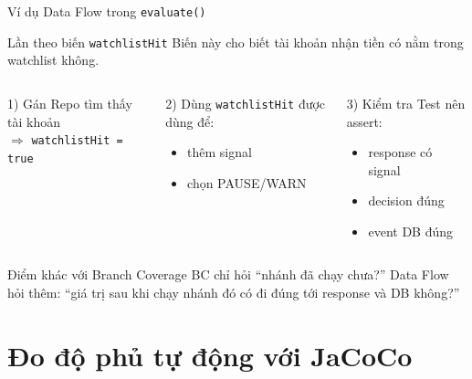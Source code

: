 \documentclass[aspectratio=169,12pt]{beamer}
\begin{document}
\begin{frame}[shrink=7]{Ví dụ Data Flow trong \texttt{evaluate()}}
  \begin{block}{Lần theo biến \texttt{watchlistHit}}
    Biến này cho biết tài khoản nhận tiền có nằm trong watchlist không.
  \end{block}

  \vspace{0.2em}
  \begin{columns}[T]
    \begin{exampleblock}{1) Gán}
      Repo tìm thấy tài khoản\\
      $\Rightarrow$ \texttt{watchlistHit = true}
    \end{exampleblock}

    \begin{exampleblock}{2) Dùng}
      \texttt{watchlistHit} được dùng để:
      \begin{itemize}
        \item thêm signal
        \item chọn PAUSE/WARN
      \end{itemize}
    \end{exampleblock}

    \begin{exampleblock}{3) Kiểm tra}
      Test nên assert:
      \begin{itemize}
        \item response có signal
        \item decision đúng
        \item event DB đúng
      \end{itemize}
    \end{exampleblock}
  \end{columns}

  \vspace{0.25em}
  \begin{alertblock}{Điểm khác với Branch Coverage}
    BC chỉ hỏi ``nhánh đã chạy chưa?'' Data Flow hỏi thêm:
    ``giá trị sau khi chạy nhánh đó có đi đúng tới response và DB không?''
  \end{alertblock}
\end{frame}

\section{Đo độ phủ tự động với JaCoCo}
\end{document}
